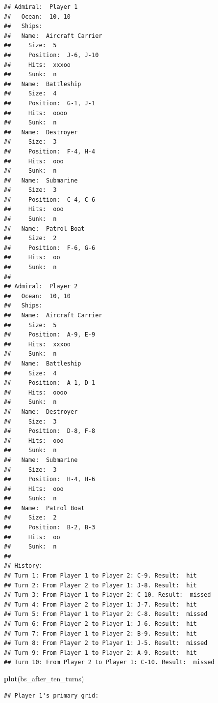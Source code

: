 \documentclass[
]{article}
\newenvironment{Shaded}{\begin{snugshade}}{\end{snugshade}}
\newcommand{\FunctionTok}[1]{\textcolor[rgb]{0.13,0.29,0.53}{\textbf{#1}}}
\newcommand{\NormalTok}[1]{#1}
\begin{document}
\begin{verbatim}
## Admiral:  Player 1 
##   Ocean:  10, 10 
##   Ships:
##   Name:  Aircraft Carrier 
##     Size:  5 
##     Position:  J-6, J-10 
##     Hits:  xxxoo 
##     Sunk:  n 
##   Name:  Battleship 
##     Size:  4 
##     Position:  G-1, J-1 
##     Hits:  oooo 
##     Sunk:  n 
##   Name:  Destroyer 
##     Size:  3 
##     Position:  F-4, H-4 
##     Hits:  ooo 
##     Sunk:  n 
##   Name:  Submarine 
##     Size:  3 
##     Position:  C-4, C-6 
##     Hits:  ooo 
##     Sunk:  n 
##   Name:  Patrol Boat 
##     Size:  2 
##     Position:  F-6, G-6 
##     Hits:  oo 
##     Sunk:  n 
## 
## Admiral:  Player 2 
##   Ocean:  10, 10 
##   Ships:
##   Name:  Aircraft Carrier 
##     Size:  5 
##     Position:  A-9, E-9 
##     Hits:  xxxoo 
##     Sunk:  n 
##   Name:  Battleship 
##     Size:  4 
##     Position:  A-1, D-1 
##     Hits:  oooo 
##     Sunk:  n 
##   Name:  Destroyer 
##     Size:  3 
##     Position:  D-8, F-8 
##     Hits:  ooo 
##     Sunk:  n 
##   Name:  Submarine 
##     Size:  3 
##     Position:  H-4, H-6 
##     Hits:  ooo 
##     Sunk:  n 
##   Name:  Patrol Boat 
##     Size:  2 
##     Position:  B-2, B-3 
##     Hits:  oo 
##     Sunk:  n 
## 
## History:
## Turn 1: From Player 1 to Player 2: C-9. Result:  hit 
## Turn 2: From Player 2 to Player 1: J-8. Result:  hit 
## Turn 3: From Player 1 to Player 2: C-10. Result:  missed 
## Turn 4: From Player 2 to Player 1: J-7. Result:  hit 
## Turn 5: From Player 1 to Player 2: C-8. Result:  missed 
## Turn 6: From Player 2 to Player 1: J-6. Result:  hit 
## Turn 7: From Player 1 to Player 2: B-9. Result:  hit 
## Turn 8: From Player 2 to Player 1: J-5. Result:  missed 
## Turn 9: From Player 1 to Player 2: A-9. Result:  hit 
## Turn 10: From Player 2 to Player 1: C-10. Result:  missed
\end{verbatim}

\begin{Shaded}
\begin{Highlighting}[]
\FunctionTok{plot}\NormalTok{(bs\_after\_ten\_turns)}
\end{Highlighting}
\end{Shaded}

\begin{verbatim}
## Player 1's primary grid:
\end{verbatim}
\end{document}
